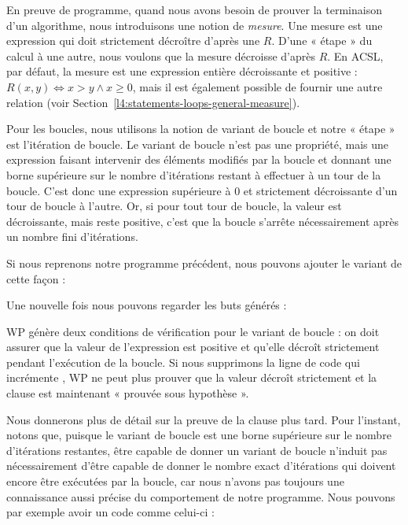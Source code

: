 \label{l4:statements-loops-variant-measure}


En preuve de programme, quand nous avons besoin de prouver la terminaison d'un
algorithme, nous introduisons une notion de \textit{mesure}. Une mesure est une
expression qui doit strictement décroître d'après une
$R$. D'une « étape » du calcul à une autre, nous voulons que la mesure décroisse
d'après $R$. En ACSL, par défaut, la mesure est une expression entière
décroissante et positive : $R(x,y) \Leftrightarrow x > y \wedge x \geq 0$, mais
il est également possible de fournir une autre relation (voir
Section~\ref{l4:statements-loops-general-measure}).


Pour les boucles, nous utilisons la notion de variant de boucle et notre
« étape » est l'itération de boucle. Le variant de boucle n'est pas une
propriété, mais une expression faisant intervenir des éléments
modifiés par la boucle et donnant une borne supérieure sur le nombre
d'itérations restant à effectuer à un tour de la boucle. C'est donc une
expression supérieure à 0 et strictement décroissante d'un tour de boucle à
l'autre. Or, si pour tout tour de boucle, la valeur est décroissante, mais reste
positive, c'est que la boucle s'arrête nécessairement après un nombre fini
d'itérations.


Si nous reprenons notre programme précédent, nous pouvons ajouter le variant
de cette façon :




Une nouvelle fois nous pouvons regarder les buts générés :




WP génère deux conditions de vérification pour le variant de boucle : on doit
assurer que la valeur de l'expression est positive et qu'elle décroît
strictement pendant l'exécution de la boucle. Si nous supprimons la ligne de
code qui incrémente , WP ne peut plus prouver que la valeur
 décroît strictement et la clause 
est maintenant « prouvée sous hypothèse ».




Nous donnerons plus de détail sur la preuve de la clause 
plus tard. Pour l'instant, notons que, puisque le variant de boucle est une
borne supérieure sur le nombre d'itérations restantes, être capable de donner un
variant de boucle n'induit pas nécessairement d'être capable de donner le nombre
exact d'itérations qui doivent encore être exécutées par la boucle, car nous
n'avons pas toujours une connaissance aussi précise du comportement de notre
programme. Nous pouvons par  exemple avoir un code comme celui-ci :


